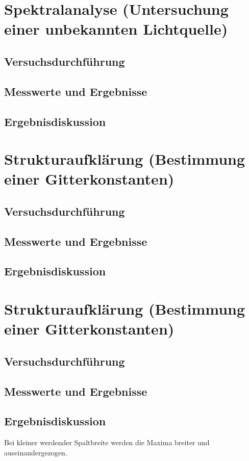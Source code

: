\documentclass{scrartcl}
\begin{document}
\section{Spektralanalyse (Untersuchung einer unbekannten Lichtquelle)}
\subsection{Versuchsdurchführung}
\subsection{Messwerte und Ergebnisse}
\subsection{Ergebnisdiskussion}

\section{Strukturaufklärung (Bestimmung einer Gitterkonstanten)}
\subsection{Versuchsdurchführung}
\subsection{Messwerte und Ergebnisse}
\subsection{Ergebnisdiskussion}

\section{Strukturaufklärung (Bestimmung einer Gitterkonstanten)}
\subsection{Versuchsdurchführung}
\subsection{Messwerte und Ergebnisse}
\subsection{Ergebnisdiskussion}
Bei kleiner werdender Spaltbreite werden die Maxima breiter und auseinandergezogen.
\end{document}
